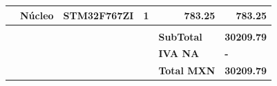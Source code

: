 \begin{landscape}
\begin{table}[H]
\begin{tabular}{|r|r|r|r|l|r|}
    \hline
    \rowcolor[rgb]{ .557,  .663,  .859} \multicolumn{1}{|l|}{Interfaz} & \multicolumn{1}{l|}{\cellcolor[rgb]{ 1,  1,  1}Núcleo} & \multicolumn{1}{l|}{\cellcolor[rgb]{ 1,  1,  1}STM32F767ZI} & \cellcolor[rgb]{ 1,  1,  1}1 & \multicolumn{1}{r|}{\cellcolor[rgb]{ 1,  1,  1}783.25} & \cellcolor[rgb]{ 1,  1,  1}783.25 \\
    \hline
          &       &       &       &       &  \\
    \hline
          &       &       &       & \textbf{SubTotal} & \textbf{30209.79} \\
    \hline
          &       &       &       & \textbf{IVA NA} & \multicolumn{1}{l|}{\textbf{-}} \\
    \hline
          &       &       &       & \textbf{Total MXN} & \textbf{30209.79} \\
    \hline
    \end{tabular}%
  \label{tab:CostoYa}%
\end{table}%
\end{landscape}









